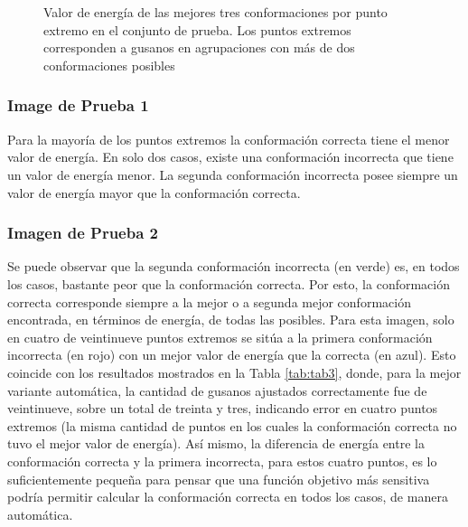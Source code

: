 \captionsetup[subfloat]{farskip=-0.8cm,captionskip=-0.2cm}
\begin{figure}[htp]
  \begin{center}
    \\
    \\
  \end{center}
  \caption[Valor de energ\'ia de las tres mejores conformaciones por punto extremo en el conjunto de prueba]
  {Valor de energ\'ia de las mejores tres conformaciones por punto extremo en el conjunto de prueba.
    Los puntos extremos corresponden a gusanos en agrupaciones con m\'as de dos conformaciones posibles}
  \label{fig:energy123}
\end{figure}

\subsubsection*{Image de Prueba 1}

Para la mayor\'ia de los puntos extremos la conformaci\'on correcta 
tiene el menor valor de energ\'ia.
En solo dos casos, existe una conformaci\'on incorrecta que tiene un valor
de energ\'ia menor. La segunda conformaci\'on incorrecta posee siempre
un valor de energ\'ia mayor que la conformaci\'on correcta.

\subsubsection*{Imagen de Prueba 2}

Se puede observar que la segunda conformaci\'on incorrecta (en verde) es,
en todos los casos, bastante peor que la conformaci\'on correcta. Por esto,
la conformaci\'on correcta corresponde siempre a la mejor o a segunda mejor
conformaci\'on encontrada, en t\'erminos de energ\'ia, de todas las posibles.
Para esta imagen, solo en cuatro de veintinueve puntos extremos se
sit\'ua a la primera conformaci\'on incorrecta (en rojo) con un mejor valor de
energ\'ia que la correcta (en azul). Esto coincide con los 
resultados mostrados en la Tabla \ref{tab:tab3}, donde, para la mejor
variante autom\'atica, la cantidad de gusanos ajustados correctamente
fue de veintinueve, sobre un total de treinta y tres, indicando error
en cuatro puntos extremos (la misma cantidad de puntos en los cuales
la conformaci\'on correcta no tuvo el mejor valor de energ\'ia). 
As\'i mismo, la diferencia de energ\'ia entre la conformaci\'on
correcta y la primera incorrecta, para estos cuatro puntos, es lo
suficientemente peque\~na para pensar que una funci\'on objetivo m\'as sensitiva
podr\'ia permitir calcular la conformaci\'on correcta en todos los casos,
de manera autom\'atica.
 

